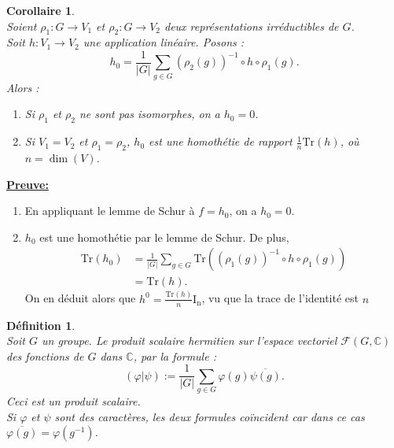 \documentclass[a4paper, 14pt]{report}
\newtheorem{definition}{Définition}[section]
\newtheorem{corollary}{Corollaire}[section]
\begin{document}
\begin{onehalfspace}
{\begin{enumerate} [label=\roman*)]
			\end{enumerate}
			
			
			\begin{corollary} \cite{serre1971representation} \label{cor1}\\
				Soient \( \rho_1 : G \rightarrow V_1 \) et \( \rho_2 : G \rightarrow V_2 \) deux représentations irréductibles de \( G \). \\
				Soit \( h  : V_1 \to V_2 \) une application linéaire. Posons :
				\[
				h_0 = \frac{1}{|G|} \sum_{g \in G} (\rho_2(g))^{-1} \circ h \circ \rho_1(g).
				\]
				Alors :
				\begin{enumerate}[label=\roman*)]
					\item Si \( \rho_1 \) et \( \rho_2 \) ne sont pas isomorphes, on a \( h_0 = 0 \).
					\item Si \( V_1 = V_2 \) et \( \rho_1 = \rho_2 \), \( h_0 \) est une homothétie de rapport \( \frac{1}{n} \text{Tr}(h)  \), où \( n = \dim(V) \).
				\end{enumerate}
			\end{corollary}
			
			
			\textbf{\underline{Preuve:}}
			\begin{enumerate}[label=\roman*)]
				\item En appliquant le lemme de Schur à \( f = h_0 \), on a \( h_0 = 0 \).
				\item \( h_0 \) est une homothétie par le lemme de Schur. De plus, \[
				\begin{aligned}
					\text{Tr}(h_0) &= \frac{1}{|G|} \sum_{g \in G} \text{Tr}((\rho_1(g))^{-1} \circ h \circ \rho_1(g)) \\
					&= \text{Tr}(h).
				\end{aligned}
				\]
On en déduit alors que \( h^0 = \frac{\text{Tr}(h)}{n} \mathrm{I_n} \), vu que la trace de l’identité est \( n \)
			\end{enumerate}
	
			
			\begin{definition} \cite{serre1971representation}\\
Soit $G$ un groupe. Le produit scalaire hermitien sur l’espace vectoriel $\mathscr{F}(G, \mathbb{C})$ des fonctions de $G$ dans $\mathbb{C}$, par la formule :
				\[
				(\varphi | \psi) := \frac{1}{|G|} \sum_{g \in G} \varphi(g) \overline{\psi(g)}.
				\]
Ceci est un produit scalaire.\\
Si $\varphi$ et $\psi$ sont des caractères, les deux formules coïncident car dans ce cas $\overline{\varphi(g)} = \varphi(g^{-1})$.
			\end{definition}

}
\end{onehalfspace}
\end{document}
